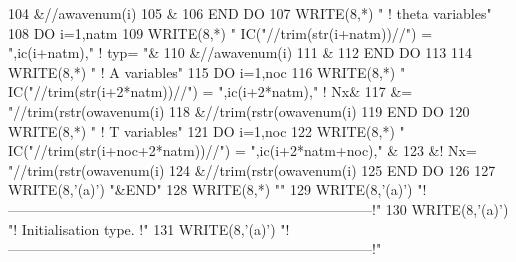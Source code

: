 \begin{DoxyCode}
104             &//awavenum(i)%
105             &%
106 \textcolor{keywordflow}{    END DO}
107     \textcolor{keyword}{WRITE}(8,*) \textcolor{stringliteral}{" ! theta variables"}
108     \textcolor{keywordflow}{DO} i=1,natm
109        \textcolor{keyword}{WRITE}(8,*) \textcolor{stringliteral}{" IC("}//trim(str(i+natm))//\textcolor{stringliteral}{") = "},ic(i+natm),\textcolor{stringliteral}{"   ! typ= "}&
110             &//awavenum(i)%
111             &%
112 \textcolor{keywordflow}{    END DO}
113 
114     \textcolor{keyword}{WRITE}(8,*) \textcolor{stringliteral}{" ! A variables"}
115     \textcolor{keywordflow}{DO} i=1,noc
116        \textcolor{keyword}{WRITE}(8,*) \textcolor{stringliteral}{" IC("}//trim(str(i+2*natm))//\textcolor{stringliteral}{") = "},ic(i+2*natm),\textcolor{stringliteral}{"   ! Nx&}
117 \textcolor{stringliteral}{}\textcolor{stringliteral}{            &= "}//trim(rstr(owavenum(i)%
118             &//trim(rstr(owavenum(i)%
119 \textcolor{keywordflow}{    END DO}
120     \textcolor{keyword}{WRITE}(8,*) \textcolor{stringliteral}{" ! T variables"}
121     \textcolor{keywordflow}{DO} i=1,noc
122        \textcolor{keyword}{WRITE}(8,*) \textcolor{stringliteral}{" IC("}//trim(str(i+noc+2*natm))//\textcolor{stringliteral}{") = "},ic(i+2*natm+noc),\textcolor{stringliteral}{"   &}
123 \textcolor{stringliteral}{}\textcolor{stringliteral}{            &! Nx= "}//trim(rstr(owavenum(i)%
124             &//trim(rstr(owavenum(i)%
125 \textcolor{keywordflow}{    END DO}
126 
127     \textcolor{keyword}{WRITE}(8,\textcolor{stringliteral}{'(a)'}) \textcolor{stringliteral}{"&END"}
128     \textcolor{keyword}{WRITE}(8,*) \textcolor{stringliteral}{""}
129     \textcolor{keyword}{WRITE}(8,\textcolor{stringliteral}{'(a)'}) \textcolor{stringliteral}{"!------------------------------------------------------------------------------!"}
130     \textcolor{keyword}{WRITE}(8,\textcolor{stringliteral}{'(a)'}) \textcolor{stringliteral}{"! Initialisation type.                                                         !"}
131     \textcolor{keyword}{WRITE}(8,\textcolor{stringliteral}{'(a)'}) \textcolor{stringliteral}{"!------------------------------------------------------------------------------!"}

\end{DoxyCode}
